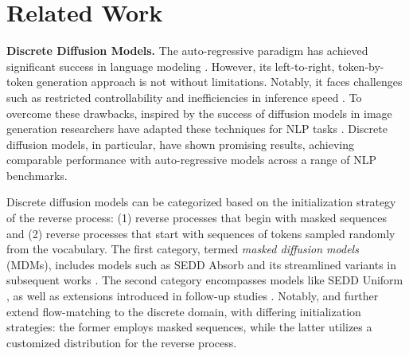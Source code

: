 
\section{Related Work}

\textbf{Discrete Diffusion Models. }  
The auto-regressive paradigm has achieved significant success in language modeling \citep{dai2019transformer,floridi2020gpt,achiam2023gpt}. However, its left-to-right, token-by-token generation approach is not without limitations. Notably, it faces challenges such as restricted controllability \citep{zhang2023tractable} and inefficiencies in inference speed \citep{leviathan2023fast}. To overcome these drawbacks, inspired by the success of diffusion models in image generation \citep{SohlDickstein2015Deep,song2021denoising,Karras2022Elucidating} researchers have adapted these techniques for NLP tasks \citep{austin2021structured,He2022DiffusionBERT,chen2022analog,Meng2022Concrete,ye2023diffusion,Gulrajani2023LikelihoodBased,zhang2024language}. Discrete diffusion models, in particular, have shown promising results, achieving comparable performance with auto-regressive models across a range of NLP benchmarks.  

Discrete diffusion models can be categorized based on the initialization strategy of the reverse process: (1) reverse processes that begin with masked sequences and (2) reverse processes that start with sequences of tokens sampled randomly from the vocabulary. The first category, termed \emph{masked diffusion models} (MDMs), includes models such as SEDD Absorb \citep{lou2024discrete} and its streamlined variants in subsequent works \citep{sahoo2024simple,zhao2024improving,shi2024simplified,ou2024your,zheng2024masked}. The second category encompasses models like SEDD Uniform \citep{lou2024discrete}, as well as extensions introduced in follow-up studies \citep{campbell2024generative}. Notably, \citet{gat2024discrete,davis2024fisher} and \citet{campbell2024generative} further extend flow-matching to the discrete domain, with differing initialization strategies: the former employs masked sequences, while the latter utilizes a customized distribution for the reverse process.


